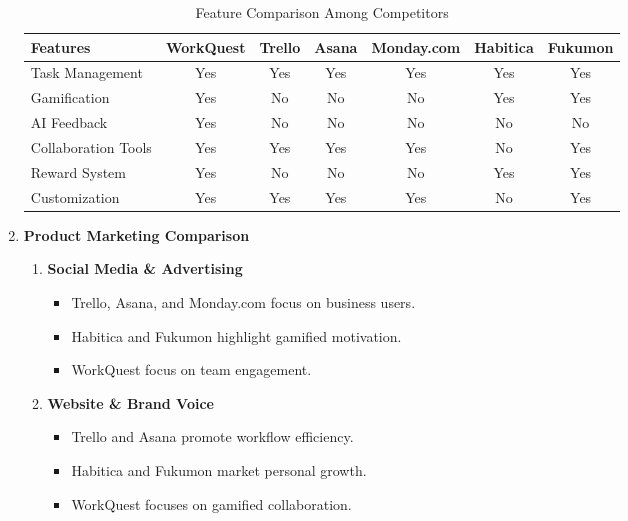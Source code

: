 \begin{enumerate}
    \medskip
    \noindent\begin{center}
    \begin{table}[ht]
        \centering
        \begin{tabular}{lcccccc}
        \hline
        Features & WorkQuest & Trello & Asana & Monday.com & Habitica & Fukumon \\
        \hline
        Task Management & Yes & Yes & Yes & Yes & Yes & Yes \\
        Gamification & Yes & No & No & No & Yes & Yes \\
        AI Feedback & Yes & No & No & No & No & No \\
        Collaboration Tools & Yes & Yes & Yes & Yes & No & Yes \\
        Reward System & Yes & No & No & No & Yes & Yes \\
        Customization & Yes & Yes & Yes & Yes & No & Yes \\
        \hline
        \end{tabular}
        \caption{Feature Comparison Among Competitors}
        \label{tab:feature-comparison}
    \end{table}
    \end{center}
    \medskip

\item \textbf{Product Marketing Comparison}
    \begin{enumerate}
        \item \textbf{Social Media \& Advertising}
        \begin{itemize}
            \item Trello, Asana, and Monday.com focus on business users.
            \item Habitica and Fukumon highlight gamified motivation.
            \item WorkQuest focus on team engagement.
        \end{itemize}
        
        \item \textbf{Website \& Brand Voice}
        \begin{itemize}
            \item Trello and Asana promote workflow efficiency.
            \item Habitica and Fukumon market personal growth.
            \item WorkQuest focuses on gamified collaboration.
        \end{itemize}
    \end{enumerate}


\end{enumerate}
